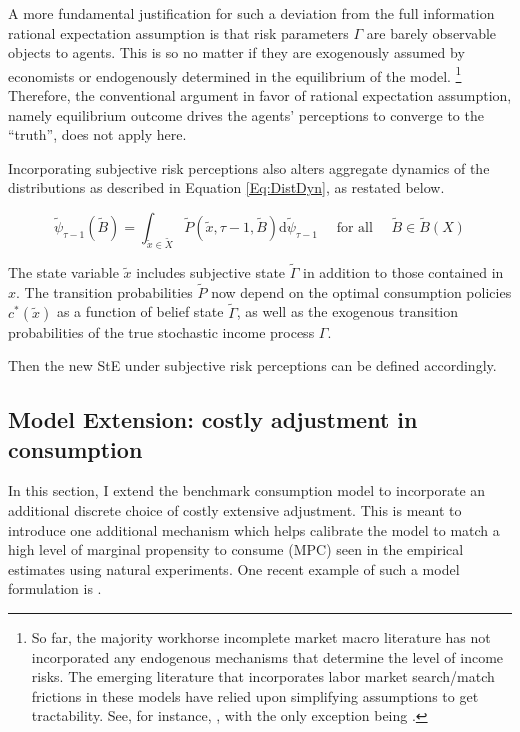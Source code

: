 A more fundamental justification for such a deviation from the full information rational expectation assumption is that risk parameters $\Gamma$ are barely observable objects to agents. This is so no matter if they are exogenously assumed by economists or endogenously determined in the equilibrium of the model. \footnote{So far, the majority workhorse incomplete market macro literature has not incorporated any endogenous mechanisms that determine the level of income risks. The emerging literature that incorporates labor market search/match frictions in these models have relied upon simplifying assumptions to get tractability. See, for instance, \cite{mckay2017time,acharya2020understanding,ravn2021macroeconomic},  with the only exception being \cite{ravn2017job}.} Therefore, the conventional argument in favor of rational expectation assumption, namely equilibrium outcome drives the agents' perceptions to converge to the ``truth'', does not apply here. 

Incorporating subjective risk perceptions also alters aggregate dynamics of the distributions as described in Equation \ref{Eq:DistDyn}, as restated below. 

\begin{equation}
\label{Eq:DistDynSub}
\tilde \psi_{\tau-1}(\tilde B)=\int_{\tilde x \in \tilde X} \tilde P(\tilde x, \tau-1, \tilde B) \mathrm{d} \tilde \psi_{\tau-1} \quad \text { for all } \quad \tilde B \in \tilde B(X)
\end{equation}

The state variable $\tilde x$ includes subjective state $\tilde \Gamma$ in addition to those contained in $x$. The transition probabilities $\tilde P$ now depend on the optimal consumption policies $c^*(\tilde x)$ as a function of belief state $\tilde \Gamma$, as well as the exogenous transition probabilities of the true stochastic income process $\Gamma$.  

Then the new StE under subjective risk perceptions can be defined accordingly. 


\subsection{Model Extension: costly adjustment in consumption}

In this section, I extend the benchmark consumption model to incorporate an additional discrete choice of costly extensive adjustment. This is meant to introduce one additional mechanism which helps calibrate the model to match a high level of marginal propensity to consume (MPC) seen in the empirical estimates using natural experiments. One recent example of such a model formulation is \cite{fuster2021would}. 

